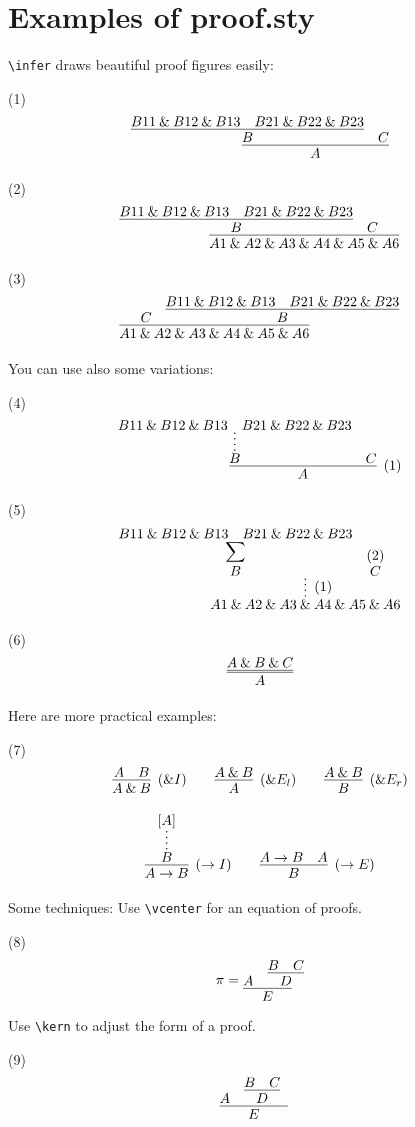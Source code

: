 \documentclass{article}
\def\imp{\to}
\def\land{\mathbin\&}
\begin{document}
\section*{Examples of proof.sty}

\verb|\infer| draws beautiful proof figures easily:

\noindent (1)
\[
\infer{A}{
	\infer{B}{
		B11\land B12\land B13
		&
		B21\land B22\land B23
	}
	&
	C
}
\]

\noindent (2)
\[
\infer{A1\land A2\land A3\land A4\land A5\land A6}{
	\infer{B}{
		B11\land B12\land B13
		&
		B21\land B22\land B23
	}
	&
	C
}
\]

\noindent (3)
\[
\infer{A1\land A2\land A3\land A4\land A5\land A6}{
	C
	&
	\infer{B}{
		B11\land B12\land B13
		&
		B21\land B22\land B23
	}
}
\]

You can use also some variations:

\noindent (4)
\[
\infer[(1)]{A}{
	\infer*{B}{
		B11\land B12\land B13
		&
		B21\land B22\land B23
	}
	&
	C
}
\]

\noindent (5)
\[
\infer*[(1)]{A1\land A2\land A3\land A4\land A5\land A6}{
	\deduce[{\displaystyle \sum}]{B}{
		B11\land B12\land B13
		&
		B21\land B22\land B23
	}
	&
	\deduce{C}{(2)}
}
\]

\noindent (6)
\[
\infer={A}{A \land B \land C}
\]

Here are more practical examples:

\noindent (7)
\[
\infer[(\land I)]{A \land B}{A & B}
\qquad
\infer[(\land E_l)]A{A\land B}
\qquad
\infer[(\land E_r)]B{A\land B}
\]

\[
\infer[(\imp I)]{A \imp B}{
	\infer*{B}{[A]}
}
\qquad
\infer[(\imp E)]{B}{
	A \imp B
	&
	A
}
\]

Some techniques:
Use \verb|\vcenter| for an equation of proofs.

\noindent (8)
\[
\pi = \vcenter{
\infer{E}{
	A
	&
	\infer{D}{B & C}
}
}
\]

Use \verb|\kern| to adjust the form of a proof.

\noindent (9)
\[
\infer{E}{
	A
	&
	\infer{D}{B & C} \kern 0.5cm
}
\]
\end{document}
